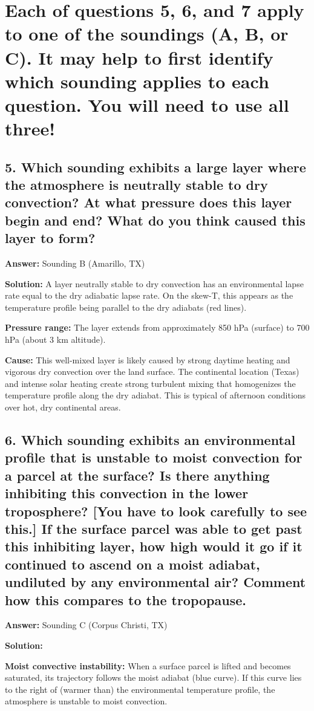 \documentclass[letterpaper, 11pt]{article}
\newcommand{\1}{\mathds{1}}	%
\theoremstyle{definition}
\begin{document}
\section*{Each of questions 5, 6, and 7 apply to one of the soundings (A, B, or C). It may help to first identify which sounding applies to each question. You will need to use all three!}

\subsection*{5. Which sounding exhibits a large layer where the atmosphere is neutrally stable to dry convection? At what pressure does this layer begin and end? What do you think caused this layer to form?}

\textbf{Answer:} Sounding B (Amarillo, TX)

\textbf{Solution:} A layer neutrally stable to dry convection has an environmental lapse rate equal to the dry adiabatic lapse rate. On the skew-T, this appears as the temperature profile being parallel to the dry adiabats (red lines).

\textbf{Pressure range:} The layer extends from approximately 850 hPa (surface) to 700 hPa (about 3 km altitude).

\textbf{Cause:} This well-mixed layer is likely caused by strong daytime heating and vigorous dry convection over the land surface. The continental location (Texas) and intense solar heating create strong turbulent mixing that homogenizes the temperature profile along the dry adiabat. This is typical of afternoon conditions over hot, dry continental areas.

\subsection*{6. Which sounding exhibits an environmental profile that is unstable to moist convection for a parcel at the surface? Is there anything inhibiting this convection in the lower troposphere? [You have to look carefully to see this.] If the surface parcel was able to get past this inhibiting layer, how high would it go if it continued to ascend on a moist adiabat, undiluted by any environmental air? Comment how this compares to the tropopause.}

\textbf{Answer:} Sounding C (Corpus Christi, TX)

\textbf{Solution:} 

\textbf{Moist convective instability:} When a surface parcel is lifted and becomes saturated, its trajectory follows the moist adiabat (blue curve). If this curve lies to the right of (warmer than) the environmental temperature profile, the atmosphere is unstable to moist convection.
\end{document}
